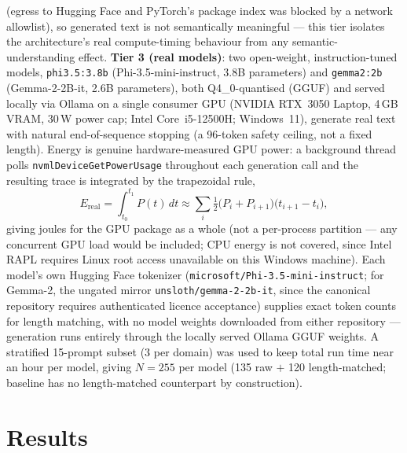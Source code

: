 \documentclass[conference]{IEEEtran}
\begin{document}
(egress to Hugging Face and PyTorch's package index was blocked by a
network allowlist), so generated text is not semantically meaningful
--- this tier isolates the architecture's real compute-timing
behaviour from any semantic-understanding effect. \textbf{Tier 3 (real
models)}: two open-weight, instruction-tuned models, \texttt{phi3.5:3.8b}
(Phi-3.5-mini-instruct, 3.8B parameters) and \texttt{gemma2:2b}
(Gemma-2-2B-it, 2.6B parameters), both Q4\_0-quantised (GGUF) and
served locally via Ollama on a single consumer GPU (NVIDIA RTX~3050
Laptop, 4\,GB VRAM, 30\,W power cap; Intel Core~i5-12500H; Windows~11),
generate real text with natural end-of-sequence stopping (a 96-token
safety ceiling, not a fixed length). Energy is genuine hardware-measured
GPU power: a background thread polls \texttt{nvmlDeviceGetPowerUsage}
throughout each generation call and the resulting trace is integrated
by the trapezoidal rule,
\begin{equation}
  E_\text{real} = \int_{t_0}^{t_1} P(t)\,dt \approx
  \sum_i \tfrac{1}{2}\big(P_i+P_{i+1}\big)\big(t_{i+1}-t_i\big),
  \label{eq:nvml}
\end{equation}
giving joules for the GPU package as a whole (not a per-process
partition --- any concurrent GPU load would be included; CPU energy is
not covered, since Intel RAPL requires Linux root access unavailable
on this Windows machine). Each model's own Hugging Face tokenizer
(\texttt{microsoft/Phi-3.5-mini-instruct}; for Gemma-2, the ungated
mirror \texttt{unsloth/gemma-2-2b-it}, since the canonical repository
requires authenticated licence acceptance) supplies exact token counts
for length matching, with no model weights downloaded from either
repository --- generation runs entirely through the locally served
Ollama GGUF weights. A stratified 15-prompt subset (3 per domain) was
used to keep total run time near an hour per model, giving $N=255$ per
model (135 raw $+$ 120 length-matched; baseline has no length-matched
counterpart by construction).
\section{Results}
\label{sec:results}
\end{document}
